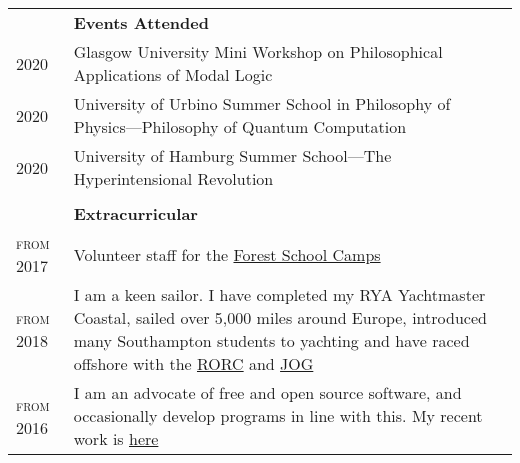 \documentclass{article}
\renewcommand{\section}[1]{\\[-1.0ex]& \multicolumn{2}{l}{\bfseries{\Large{#1}}}\vspace{0.5ex}\\}
\newcommand{\entry}[3]{\scriptsize{\textsc{#1}} & #2 & #3 \\}
\begin{document}
\begin{tabularx}{\textwidth}{ p{6em} X p{6em} }
\section{Events Attended}
\entry{2020}{Glasgow University Mini Workshop on Philosophical Applications of Modal Logic}{}
\entry{2020}{University of Urbino Summer School in Philosophy of Physics---Philosophy of \mbox{Quantum} Computation}{}
\entry{2020}{University of Hamburg Summer School---The Hyperintensional Revolution}{}

\section{Extracurricular}
\entry{from 2017}{Volunteer staff for the \href{https://www.fsc.org.uk/}{Forest School Camps}}{}
\entry{from 2018}{I am a keen sailor. I have completed my RYA Yachtmaster Coastal, sailed over 5,000 miles around Europe, introduced many Southampton students to yachting and have raced offshore with the \href{https://www.rorc.org}{RORC} and \href{https://jog.org.uk}{JOG}}{}
\entry{from 2016}{I am an advocate of free and open source software, and occasionally develop programs in line with this. My recent work is \href{https://github.com/Hugo-Heagren?tab=repositories\&q=\&type=public\&language=}{here}}{}
\end{tabularx}
\end{document}
